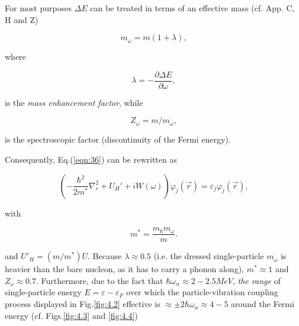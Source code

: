 \documentclass[a4paper,14pt]{book}
\begin{document}
For most purposes $\Delta E$ can be treated in terms of an effective mass (cf. App. C, H and Z)

\begin{equation}
m_{\omega} = m(1+\lambda),
\label{eqn:38}
\end{equation}

\noindent where

\begin{equation}
\lambda= - \frac{\partial \Delta E}{\partial \omega},
\label{eqn:39}
\end{equation}

\noindent is the {\it mass enhancement factor}, while

\begin{equation}
\nonumber
Z_{\omega}=m/m_{\omega},
\end{equation}

\noindent is the spectroscopic factor (discontinuity of the Fermi energy).

Consequently, Eq.(\ref{eqn:36}) can be rewritten as

\begin{equation}
\left( - \frac{\hbar^2}{2m^*} \nabla_r^2 + U_H' + i W(\omega) \right) \varphi_j(\vec{r}) = \varepsilon_j \varphi_j(\vec{r}),
\label{eqn:40a}
\end{equation}

\noindent with

\begin{equation}
m^* = \frac{m_k m_{\omega}}{m} .
\label{eqn:40b}
\end{equation}

\noindent and $U'_H = (m/m^*) U$. Because $\lambda \approx 0.5$ (i.e. the dressed single-particle $m_{\omega}$ is heavier than the bare nucleon, as it has to carry a phonon along), $m^* \approx 1$ and $Z_{\omega} \approx 0.7$. Furthermore, due to the fact that $\hbar \omega_{\alpha} \approx 2-2.5 MeV$, {\it the range} of single-particle energy $E=\varepsilon-\varepsilon_F$ over which the particle-vibration coupling process displayed in Fig.\ref{fig:4.2} effective is $\approx \pm 2\hbar \omega_{\alpha} \approx 4-5$ around the Fermi energy (cf. Figs.\ref{fig:4.3} and \ref{fig:4.4})
\end{document}

